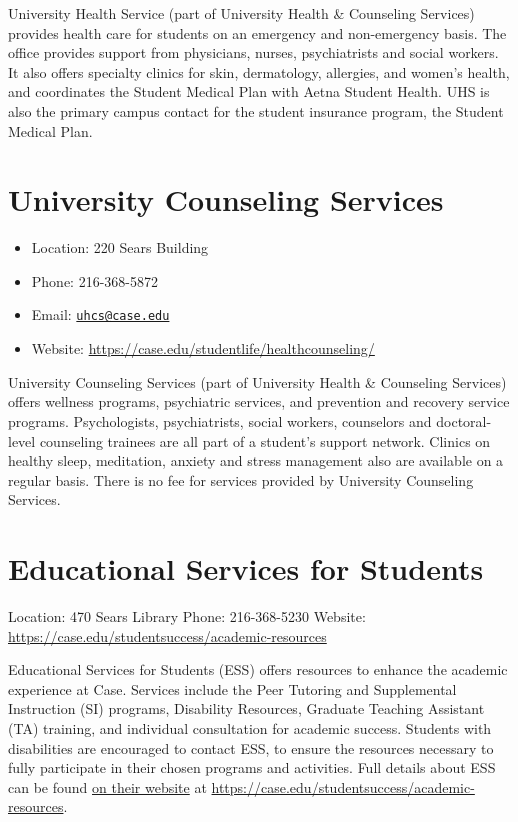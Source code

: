 \documentclass[
]{book}
\providecommand{\tightlist}{%
  \setlength{\itemsep}{0pt}\setlength{\parskip}{0pt}}
\begin{document}
University Health Service (part of University Health \& Counseling Services) provides health care for students on an emergency and non-emergency basis. The office provides support from physicians, nurses, psychiatrists and social workers. It also offers specialty clinics for skin, dermatology, allergies, and women's health, and coordinates the Student Medical Plan with Aetna Student Health. UHS is also the primary campus contact for the student insurance program, the Student Medical Plan.

\hypertarget{university-counseling-services}{%
\section{University Counseling Services}\label{university-counseling-services}}

\begin{itemize}
\tightlist
\item
  Location: 220 Sears Building
\item
  Phone: 216-368-5872
\item
  Email: \href{mailto:uhcs@case.edu}{\nolinkurl{uhcs@case.edu}}
\item
  Website: \url{https://case.edu/studentlife/healthcounseling/}
\end{itemize}

University Counseling Services (part of University Health \& Counseling Services) offers wellness programs, psychiatric services, and prevention and recovery service programs. Psychologists, psychiatrists, social workers, counselors and doctoral-level counseling trainees are all part of a student's support network. Clinics on healthy sleep, meditation, anxiety and stress management also are available on a regular basis. There is no fee for services provided by University Counseling Services.

\hypertarget{educational-services-for-students}{%
\section{Educational Services for Students}\label{educational-services-for-students}}

Location: 470 Sears Library
Phone: 216-368-5230
Website: \url{https://case.edu/studentsuccess/academic-resources}

Educational Services for Students (ESS) offers resources to enhance the academic experience at Case. Services include the Peer Tutoring and Supplemental Instruction (SI) programs, Disability Resources, Graduate Teaching Assistant (TA) training, and individual consultation for academic success. Students with disabilities are encouraged to contact ESS, to ensure the resources necessary to fully participate in their chosen programs and activities. Full details about ESS can be found \href{https://case.edu/studentsuccess/academic-resources}{on their website} at \url{https://case.edu/studentsuccess/academic-resources}.
\end{document}
